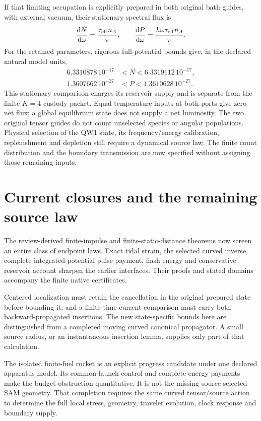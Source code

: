 \documentclass[10pt,twocolumn,letterpaper]{article}
\newcommand{\dd}{\mathrm{d}}
\renewcommand{\hbar}{\mathchar'26\mkern-9mu h}
\begin{document}
If that limiting occupation is explicitly prepared in both original bath
guides, with external vacuum, their stationary spectral flux is
\[
 \frac{\dd\dot N}{\dd\omega}=\frac{\tau_{\rm eff}n_A}{\pi},\qquad
 \frac{\dd P}{\dd\omega}=\frac{\hbar\omega\tau_{\rm eff}n_A}{\pi}.
\]
For the retained parameters, rigorous full-potential bounds give, in the
declared natural model units,
\[
 \begin{split}
 6.3310878\,10^{-17}&<\dot N<6.3319112\,10^{-17},\\
 1.3607662\,10^{-27}&<P<1.3610628\,10^{-27}.
 \end{split}
\]
This stationary comparison charges its reservoir supply and is separate from
the finite $K=4$ custody packet. Equal-temperature inputs at both ports give
zero net flux; a global equilibrium state does not supply a net luminosity.
The two original tensor guides do not count unselected species or angular
populations. Physical selection of the QW1 state, its frequency/energy
calibration, replenishment and depletion still require a dynamical source
law. The finite count distribution and the boundary transmission are now
specified without assigning those remaining inputs.


\section{Current closures and the remaining source law}
The review-derived finite-impulse and finite-static-distance theorems now
screen an entire class of endpoint laws. Exact tidal strain, the selected
curved inverse, complete integrated-potential pulse payment, flash energy
and conservative reservoir account sharpen the earlier interfaces. Their
proofs and stated domains accompany the finite native certificates.

Centered localization must retain the cancellation in the original prepared
state before bounding it, and a finite-time current comparison must carry
both backward-propagated insertions. The new state-specific bounds here
are distinguished from a completed moving curved canonical propagator.
A small source radius, or an instantaneous insertion lemma, supplies only
part of that calculation.

The isolated finite-fuel rocket is an explicit progress candidate under
one declared apparatus model. Its common-launch control and complete
energy payments make the budget obstruction quantitative. It is not the
missing source-selected SAM geometry. That completion requires the same
curved tensor/source action to determine the full local stress, geometry,
traveler evolution, clock response and boundary supply.
\end{document}
